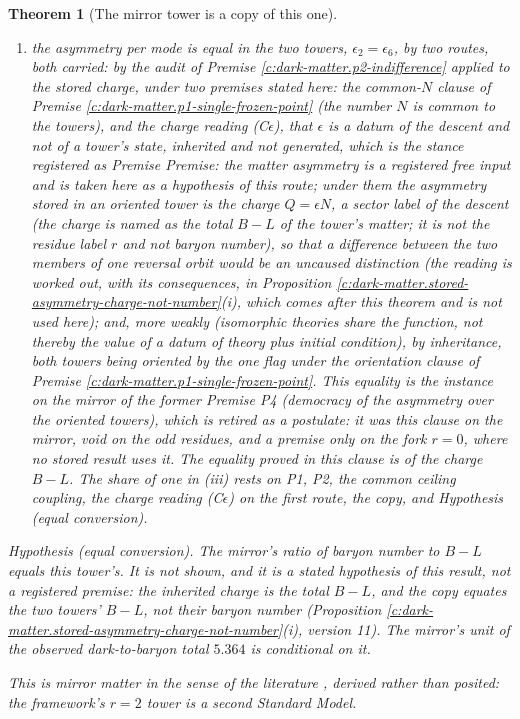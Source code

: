 \documentclass[11pt]{article}
\newtheorem{theorem}{Theorem}[section]
\theoremstyle{definition}
\theoremstyle{plain}
\begin{document}
\begin{theorem}[The mirror tower is a copy of this one]
\begin{enumerate}
\item[(v)] the asymmetry per mode is equal in the two towers, $\epsilon_{2} = \epsilon_{6}$, by two routes, both carried: by the audit of Premise \ref{c:dark-matter.p2-indifference} applied to the stored charge, under two premises stated here: the common-$N$ clause of Premise \ref{c:dark-matter.p1-single-frozen-point} (the number $N$ is common to the towers), and the charge reading (C$\epsilon$), that $\epsilon$ is a datum of the descent and not of a tower's state, inherited and not generated, which is the stance registered as Premise \emph{Premise: the matter asymmetry is a registered free input} and is taken here as a hypothesis of this route; under them the asymmetry stored in an oriented tower is the charge $Q = \epsilon N$, a sector label of the descent (the charge is named as the total $B - L$ of the tower's matter; it is not the residue label $r$ and not baryon number), so that a difference between the two members of one reversal orbit would be an uncaused distinction (the reading is worked out, with its consequences, in Proposition \ref{c:dark-matter.stored-asymmetry-charge-not-number}(i), which comes after this theorem and is not used here); and, more weakly (isomorphic theories share the function, not thereby the value of a datum of theory plus initial condition), by inheritance, both towers being oriented by the one flag under the orientation clause of Premise \ref{c:dark-matter.p1-single-frozen-point}. This equality is the instance on the mirror of the former Premise P4 (democracy of the asymmetry over the oriented towers), which is retired as a postulate: it was this clause on the mirror, void on the odd residues, and a premise only on the fork $r = 0$, where no stored result uses it. The equality proved in this clause is of the charge $B - L$. The share of one in (iii) rests on P1, P2, the common ceiling coupling, the charge reading (C$\epsilon$) on the first route, the copy, and Hypothesis (equal conversion).
\end{enumerate}
\emph{Hypothesis (equal conversion).} The mirror's ratio of baryon number to $B - L$ equals this tower's. It is not shown, and it is a stated hypothesis of this result, not a registered premise: the inherited charge is the total $B - L$, and the copy equates the two towers' $B - L$, not their baryon number (Proposition \ref{c:dark-matter.stored-asymmetry-charge-not-number}(i), version 11). The mirror's unit of the observed dark-to-baryon total $5.364$ is conditional on it.

This is mirror matter in the sense of the literature \cite{FootMirror2004}, derived rather than posited: the framework's $r = 2$ tower is a second Standard Model.


\end{theorem}
\end{document}
